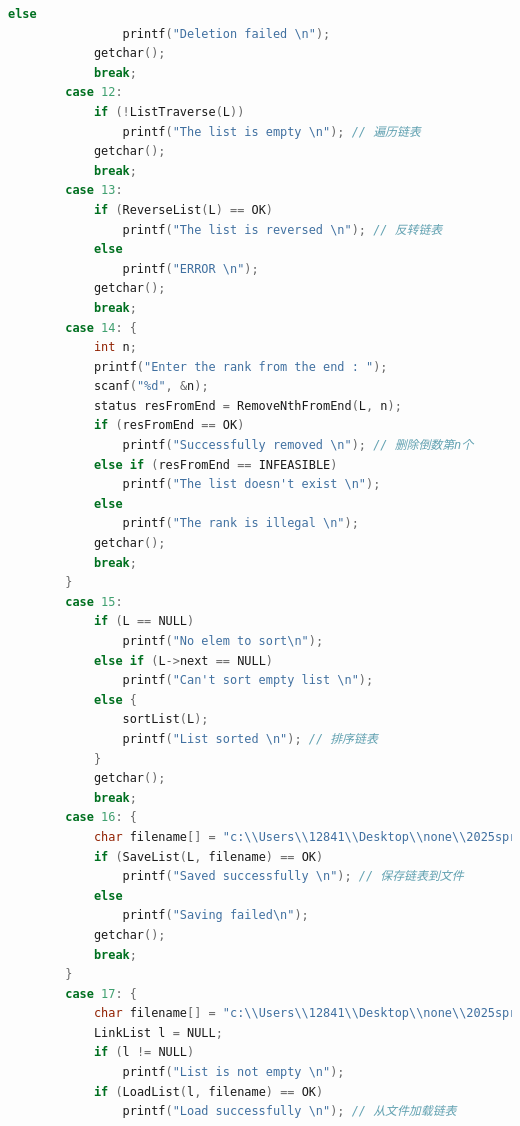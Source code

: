 \documentclass[supercite]{Experimental_Report}
\theoremstyle{definition}
\begin{document}
\begin{lstlisting}[language=c]
            else
                printf("Deletion failed \n");
            getchar();
            break;
        case 12:
            if (!ListTraverse(L))
                printf("The list is empty \n"); // 遍历链表
            getchar();
            break;
        case 13:
            if (ReverseList(L) == OK)
                printf("The list is reversed \n"); // 反转链表
            else
                printf("ERROR \n");
            getchar();
            break;
        case 14: {
            int n;
            printf("Enter the rank from the end : ");
            scanf("%d", &n);
            status resFromEnd = RemoveNthFromEnd(L, n);
            if (resFromEnd == OK)
                printf("Successfully removed \n"); // 删除倒数第n个
            else if (resFromEnd == INFEASIBLE)
                printf("The list doesn't exist \n");
            else
                printf("The rank is illegal \n");
            getchar();
            break;
        }
        case 15:
            if (L == NULL)
                printf("No elem to sort\n");
            else if (L->next == NULL)
                printf("Can't sort empty list \n");
            else {
                sortList(L);
                printf("List sorted \n"); // 排序链表
            }
            getchar();
            break;
        case 16: {
            char filename[] = "c:\\Users\\12841\\Desktop\\none\\2025springDS\\experiments\\ex2\\list2.txt";
            if (SaveList(L, filename) == OK)
                printf("Saved successfully \n"); // 保存链表到文件
            else
                printf("Saving failed\n");
            getchar();
            break;
        }
        case 17: {
            char filename[] = "c:\\Users\\12841\\Desktop\\none\\2025springDS\\experiments\\ex2\\list2.txt";
            LinkList l = NULL;
            if (l != NULL)
                printf("List is not empty \n");
            if (LoadList(l, filename) == OK)
                printf("Load successfully \n"); // 从文件加载链表

\end{lstlisting}
\end{document}
